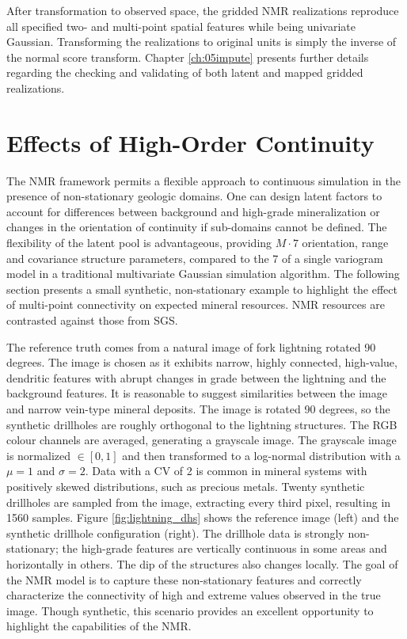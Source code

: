 After transformation to observed space, the gridded \gls{NMR} realizations reproduce all specified two- and multi-point spatial features while being univariate Gaussian. Transforming the realizations to original units is simply the inverse of the normal score transform. Chapter \ref{ch:05impute} presents further details regarding the checking and validating of both latent and mapped gridded realizations.


\FloatBarrier
\section{Effects of High-Order Continuity}
\label{sec:03effect}

The \gls{NMR} framework permits a flexible approach to continuous simulation in the presence of non-stationary geologic domains. One can design latent factors to account for differences between background and high-grade mineralization or changes in the orientation of continuity if sub-domains cannot be defined. The flexibility of the latent pool is advantageous, providing $M \cdot 7$ orientation, range and covariance structure parameters, compared to the 7 of a single variogram model in a traditional multivariate Gaussian simulation algorithm. The following section presents a small synthetic, non-stationary example to highlight the effect of multi-point connectivity on expected mineral resources. \Gls{NMR} resources are contrasted against those from \gls{SGS}.

The reference truth comes from a natural image of fork lightning rotated 90 degrees. The image is chosen as it exhibits narrow, highly connected, high-value, dendritic features with abrupt changes in grade between the lightning and the background features. It is reasonable to suggest similarities between the image and narrow vein-type mineral deposits. The image is rotated 90 degrees, so the synthetic drillholes are roughly orthogonal to the lightning structures. The \gls{RGB} colour channels are averaged, generating a grayscale image. The grayscale image is normalized $\in [0, 1]$ and then transformed to a log-normal distribution with a $\mu = 1$ and $\sigma = 2$. Data with a \gls{CV} of 2 is common in mineral systems with positively skewed distributions, such as precious metals. Twenty synthetic drillholes are sampled from the image, extracting every third pixel, resulting in 1560 samples. Figure \ref{fig:lightning_dhs} shows the reference image (left) and the synthetic drillhole configuration (right). The drillhole data is strongly non-stationary; the high-grade features are vertically continuous in some areas and horizontally in others. The dip of the structures also changes locally. The goal of the \gls{NMR} model is to capture these non-stationary features and correctly characterize the connectivity of high and extreme values observed in the true image. Though synthetic, this scenario provides an excellent opportunity to highlight the capabilities of the \gls{NMR}.

